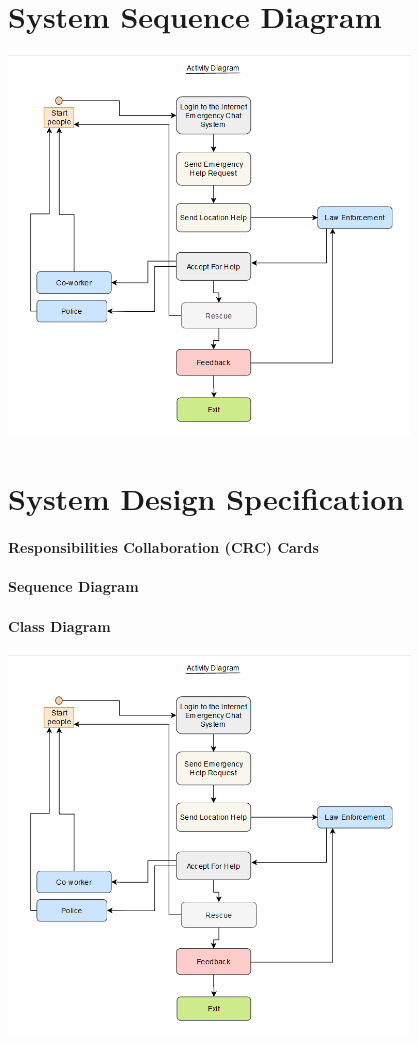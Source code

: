 \documentclass{article}
\begin{document}
\section{System Sequence Diagram}
\includegraphics[width=0.8\textwidth]{Activity_Diagram.png}


\newpage
\section{System Design Specification}
\paragraph{Responsibilities Collaboration (CRC) Cards}
\paragraph{Sequence Diagram}


\paragraph{Class Diagram}
\includegraphics[width=0.8\textwidth]{Activity_Diagram.png}
\end{document}
